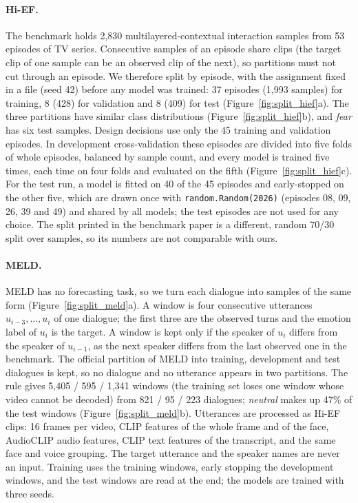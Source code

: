 \documentclass[11pt]{article}
\begin{document}
\paragraph{Hi-EF.} The benchmark holds 2{,}830 multilayered-contextual interaction samples from 53 episodes of TV
series. Consecutive samples of an episode share clips (the target clip of one sample can be an observed clip of the next),
so partitions must not cut through an episode. We therefore split by episode, with the assignment fixed in a file (seed 42)
before any model was trained: 37 episodes (1{,}993 samples) for training, 8 (428) for validation and 8 (409) for test
(Figure~\ref{fig:split_hief}a). The three partitions have similar class distributions (Figure~\ref{fig:split_hief}b), and
\emph{fear} has six test samples. Design decisions use only the 45 training and validation episodes. In development
cross-validation these episodes are divided into five folds of whole episodes, balanced by sample count, and every model is
trained five times, each time on four folds and evaluated on the fifth (Figure~\ref{fig:split_hief}c). For the test run,
a model is fitted on 40 of the 45 episodes and early-stopped on the other five, which are drawn once with
\texttt{random.Random(2026)} (episodes 08, 09, 26, 39 and 49) and shared by all models; the test episodes are not used
for any choice. The split printed in the benchmark paper is a different, random 70/30 split over samples, so its numbers
are not comparable with ours.

\paragraph{MELD.} MELD has no forecasting task, so we turn each dialogue into samples of the same form
(Figure~\ref{fig:split_meld}a). A window is four consecutive utterances $u_{i-3}, \dots, u_i$ of one dialogue; the first
three are the observed turns and the emotion label of $u_i$ is the target. A window is kept only if the speaker of $u_i$
differs from the speaker of $u_{i-1}$, as the next speaker differs from the last observed one in the benchmark. The
official partition of MELD into training, development and test dialogues is kept, so no dialogue and no
utterance appears in two partitions. The rule gives 5{,}405 / 595 / 1{,}341 windows (the training set loses one window whose video
cannot be decoded) from 821 / 95 / 223 dialogues; \emph{neutral} makes up 47\% of the test windows (Figure~\ref{fig:split_meld}b).
Utterances are processed as Hi-EF clips: 16 frames per video, CLIP features of the whole frame and of the face, AudioCLIP
audio features, CLIP text features of the transcript, and the same face and voice grouping. The target utterance and the
speaker names are never an input. Training uses the training windows, early stopping the development windows, and the
test windows are read at the end; the models are trained with three seeds.
\end{document}
